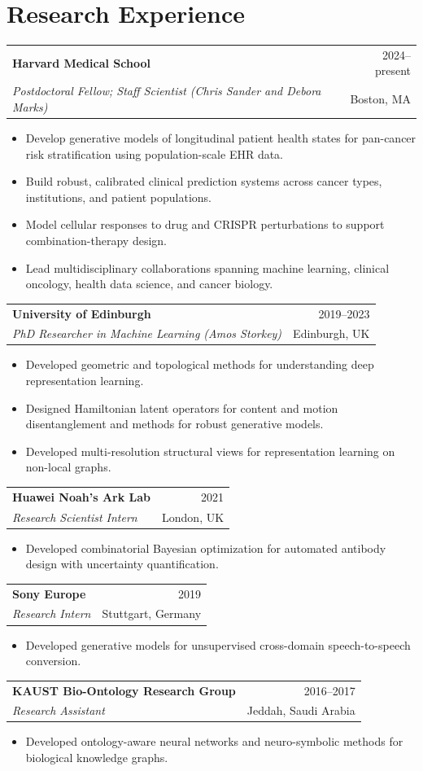 \documentclass[10pt,a4paper]{article}
\makeatletter
\newcommand{\entry}[4]{%
  \par\noindent\begin{tabularx}{\textwidth}{@{}Xr@{}}
    \textbf{#1} & \color{muted}#2 \\
    \textit{#3} & \color{muted}#4
  \end{tabularx}\par\vspace{3pt}
}
\makeatother
\begin{document}
\section{Research Experience}
\entry{Harvard Medical School}{2024--present}{Postdoctoral Fellow; Staff Scientist (Chris Sander and Debora Marks)}{Boston, MA}
\begin{itemize}
  \item Develop generative models of longitudinal patient health states for pan-cancer risk stratification using population-scale EHR data.
  \item Build robust, calibrated clinical prediction systems across cancer types, institutions, and patient populations.
  \item Model cellular responses to drug and CRISPR perturbations to support combination-therapy design.
  \item Lead multidisciplinary collaborations spanning machine learning, clinical oncology, health data science, and cancer biology.
\end{itemize}

\entry{University of Edinburgh}{2019--2023}{PhD Researcher in Machine Learning (Amos Storkey)}{Edinburgh, UK}
\begin{itemize}
  \item Developed geometric and topological methods for understanding deep representation learning.
  \item Designed Hamiltonian latent operators for content and motion disentanglement and methods for robust generative models.
  \item Developed multi-resolution structural views for representation learning on non-local graphs.
\end{itemize}

\entry{Huawei Noah's Ark Lab}{2021}{Research Scientist Intern}{London, UK}
\begin{itemize}
  \item Developed combinatorial Bayesian optimization for automated antibody design with uncertainty quantification.
\end{itemize}

\entry{Sony Europe}{2019}{Research Intern}{Stuttgart, Germany}
\begin{itemize}
  \item Developed generative models for unsupervised cross-domain speech-to-speech conversion.
\end{itemize}

\entry{KAUST Bio-Ontology Research Group}{2016--2017}{Research Assistant}{Jeddah, Saudi Arabia}
\begin{itemize}
  \item Developed ontology-aware neural networks and neuro-symbolic methods for biological knowledge graphs.
\end{itemize}
\end{document}
